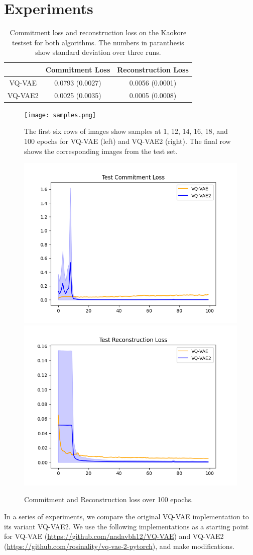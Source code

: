 \documentclass{article}
\begin{document}
\section{Experiments}

\begin{table}
    \centering
    \begin{tabular}{c c c}
        & Commitment Loss & Reconstruction Loss \\
        \hline
        VQ-VAE & 0.0793 (0.0027) & 0.0056 (0.0001) \\
        VQ-VAE2 & 0.0025 (0.0035) & 0.0005 (0.0008)
    \end{tabular}
    \label{table:loss}
    \caption{Commitment loss and reconstruction loss on the Kaokore testset for both algorithms. The numbers in paranthesis show standard deviation over three runs.}
\end{table}

\begin{figure}
    \centering
    \texttt{[image: samples.png]}
    \label{fig:samples}
    \caption{The first six rows of images show samples at 1, 12, 14, 16, 18, and 100 epochs for VQ-VAE (left) and VQ-VAE2 (right). The final row shows the corresponding images from the test set.}
\end{figure} 

\begin{figure}
    \centering
    \includegraphics[width=.4\linewidth]{commit.png}
    \includegraphics[width=.4\linewidth]{recon.png}
    \caption{Commitment and Reconstruction loss over 100 epochs.}
    \label{fig:loss}
\end{figure}

In a series of experiments, we compare the original VQ-VAE implementation to its variant VQ-VAE2. We use the following implementations as a starting point for VQ-VAE (\url{https://github.com/nadavbh12/VQ-VAE}) and VQ-VAE2 (\url{https://github.com/rosinality/vq-vae-2-pytorch}), and make modifications.
\end{document}
